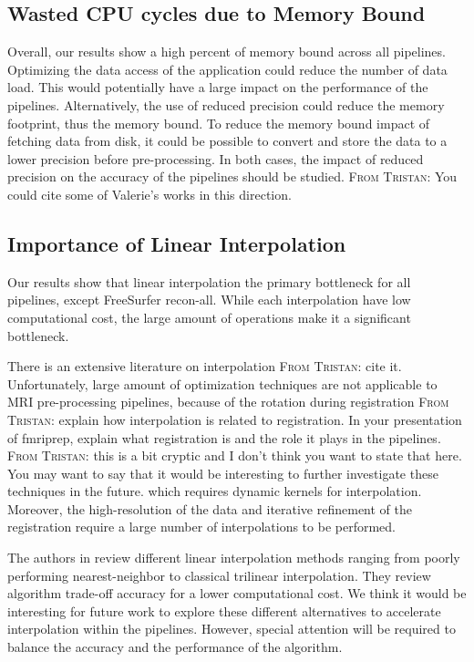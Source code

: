 \documentclass[conference]{IEEEtran}
\newcommand{\TG}[1]{\color{blue}\textsc{From Tristan: }#1\color{black}}
\begin{document}
\subsection{Wasted CPU cycles due to Memory Bound}
Overall, our results show a high percent of memory bound across all pipelines.
Optimizing the data access of the application could reduce the number of data load. This would potentially have a large impact on the performance of the pipelines. Alternatively, the use of reduced precision could reduce the memory footprint, thus the memory bound. To reduce the memory bound impact of fetching data from disk, it could be possible to convert and store the data to a lower precision before pre-processing. In both cases, the impact of reduced precision on the accuracy of the pipelines should be studied.
\TG{You could cite some of Valerie's works in this direction.}

\subsection{Importance of Linear Interpolation}
Our results show that linear interpolation the primary bottleneck for all pipelines, except FreeSurfer recon-all. While each interpolation have low computational cost, the large amount of operations make it a significant bottleneck.

There is an extensive literature on interpolation \TG{cite it}. Unfortunately, large amount of optimization techniques are not applicable to MRI pre-processing pipelines, because of the rotation during registration \TG{explain how interpolation is related to registration. In your presentation of fmriprep, explain what registration is and the role it plays in the pipelines.} \TG{this is a bit cryptic and I don't think you want to state that here. You may want to say that it would be interesting to further investigate these techniques in the future.} which requires dynamic kernels for interpolation. Moreover, the high-resolution of the data and iterative refinement of the registration require a large number of interpolations to be performed.

The authors in \cite{Canelhas2018-vs} review different linear interpolation methods ranging from poorly performing nearest-neighbor to classical trilinear interpolation. They review algorithm trade-off accuracy for a lower computational cost. We think it would be interesting for future work to explore these different alternatives to accelerate interpolation within the pipelines. However, special attention will be required to balance the accuracy and the performance of the algorithm.
\end{document}
